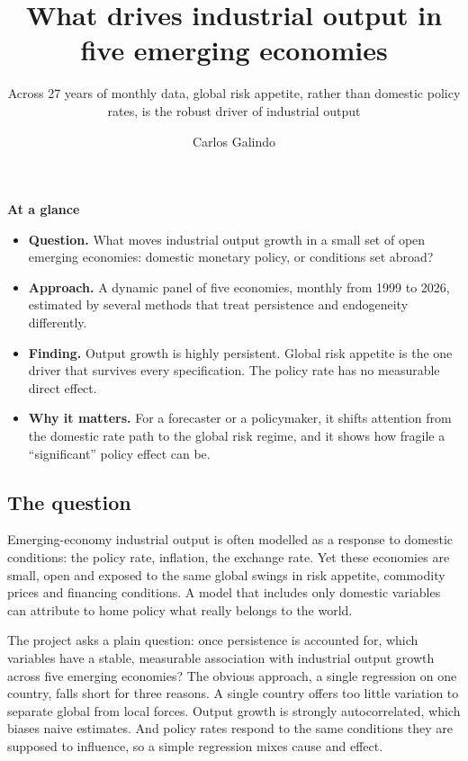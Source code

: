 \documentclass[
  british,
  a4paper,
]{article}
\title{What drives industrial output in five emerging economies}
\subtitle{Across 27 years of monthly data, global risk appetite, rather
than domestic policy rates, is the robust driver of industrial output}
\author{Carlos Galindo}
\date{}
\providecommand{\tightlist}{%
  \setlength{\itemsep}{0pt}\setlength{\parskip}{0pt}}
\begin{document}
\maketitle


\begin{tcolorbox}[enhanced jigsaw, arc=.35mm, bottomrule=.15mm, breakable, colback=white, colframe=quarto-callout-note-color-frame, left=2mm, leftrule=.75mm, opacityback=0, rightrule=.15mm, toprule=.15mm]

\vspace{-3mm}\textbf{At a glance}\vspace{3mm}

\begin{itemize}
\tightlist
\item
  \textbf{Question.} What moves industrial output growth in a small set
  of open emerging economies: domestic monetary policy, or conditions
  set abroad?
\item
  \textbf{Approach.} A dynamic panel of five economies, monthly from
  1999 to 2026, estimated by several methods that treat persistence and
  endogeneity differently.
\item
  \textbf{Finding.} Output growth is highly persistent. Global risk
  appetite is the one driver that survives every specification. The
  policy rate has no measurable direct effect.
\item
  \textbf{Why it matters.} For a forecaster or a policymaker, it shifts
  attention from the domestic rate path to the global risk regime, and
  it shows how fragile a ``significant'' policy effect can be.
\end{itemize}

\end{tcolorbox}

\subsection{The question}\label{the-question}

Emerging-economy industrial output is often modelled as a response to
domestic conditions: the policy rate, inflation, the exchange rate. Yet
these economies are small, open and exposed to the same global swings in
risk appetite, commodity prices and financing conditions. A model that
includes only domestic variables can attribute to home policy what
really belongs to the world.

The project asks a plain question: once persistence is accounted for,
which variables have a stable, measurable association with industrial
output growth across five emerging economies? The obvious approach, a
single regression on one country, falls short for three reasons. A
single country offers too little variation to separate global from local
forces. Output growth is strongly autocorrelated, which biases naive
estimates. And policy rates respond to the same conditions they are
supposed to influence, so a simple regression mixes cause and effect.
\end{document}
